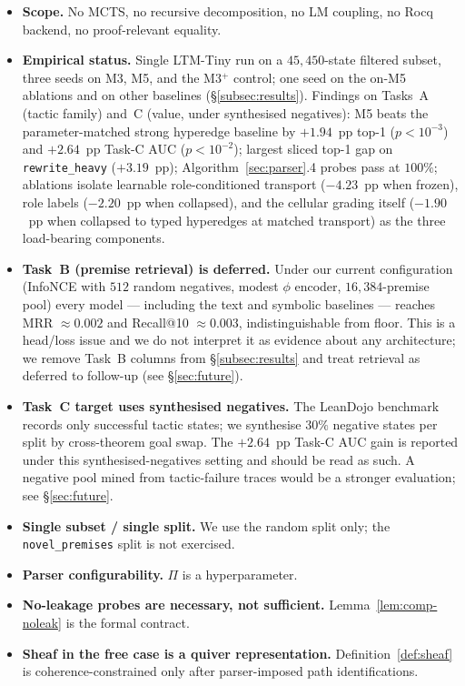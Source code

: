 \documentclass[11pt]{article}
\theoremstyle{definition}
\theoremstyle{plain}
\begin{document}
\begin{itemize}
\item \textbf{Scope.} No MCTS, no recursive decomposition, no LM coupling, no Rocq backend, no proof-relevant equality.
\item \textbf{Empirical status.} Single LTM-Tiny run on a $45{,}450$-state filtered subset, three seeds on M3, M5, and the M3$^{+}$ control; one seed on the on-M5 ablations and on other baselines (\S\ref{subsec:results}). Findings on Tasks~A (tactic family) and~C (value, under synthesised negatives): M5 beats the parameter-matched strong hyperedge baseline by $+1.94$~pp top-1 ($p < 10^{-3}$) and $+2.64$~pp Task-C AUC ($p < 10^{-2}$); largest sliced top-1 gap on \texttt{rewrite\_heavy} ($+3.19$~pp); Algorithm~\ref{sec:parser}.4 probes pass at $100\%$; ablations isolate learnable role-conditioned transport ($-4.23$~pp when frozen), role labels ($-2.20$~pp when collapsed), and the cellular grading itself ($-1.90$~pp when collapsed to typed hyperedges at matched transport) as the three load-bearing components.
\item \textbf{Task~B (premise retrieval) is deferred.} Under our current configuration (InfoNCE with $512$ random negatives, modest $\phi$ encoder, $16{,}384$-premise pool) every model — including the text and symbolic baselines — reaches MRR $\approx 0.002$ and Recall@10 $\approx 0.003$, indistinguishable from floor. This is a head/loss issue and we do not interpret it as evidence about any architecture; we remove Task~B columns from \S\ref{subsec:results} and treat retrieval as deferred to follow-up (see \S\ref{sec:future}).
\item \textbf{Task~C target uses synthesised negatives.} The LeanDojo benchmark records only successful tactic states; we synthesise $30\%$ negative states per split by cross-theorem goal swap. The $+2.64$~pp Task-C AUC gain is reported under this synthesised-negatives setting and should be read as such. A negative pool mined from tactic-failure traces would be a stronger evaluation; see \S\ref{sec:future}.
\item \textbf{Single subset / single split.} We use the random split only; the \texttt{novel\_premises} split is not exercised.
\item \textbf{Parser configurability.} $\Pi$ is a hyperparameter.
\item \textbf{No-leakage probes are necessary, not sufficient.} Lemma~\ref{lem:comp-noleak} is the formal contract.
\item \textbf{Sheaf in the free case is a quiver representation.} Definition~\ref{def:sheaf} is coherence-constrained only after parser-imposed path identifications.

\end{itemize}
\end{document}
